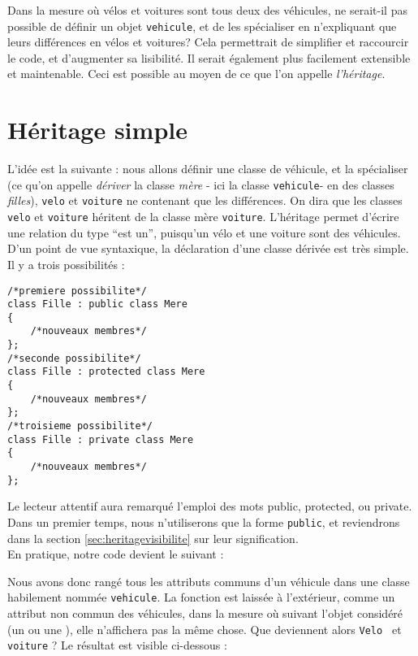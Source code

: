 Dans la mesure o\`u v\'elos et voitures sont tous deux des v\'ehicules, ne
serait-il pas possible de d\'efinir un objet \texttt{vehicule}, et de les
sp\'ecialiser en n'expliquant que leurs diff\'erences en v\'elos et voitures?
Cela permettrait de simplifier et raccourcir le code,  et d'augmenter sa
lisibilit\'e. Il serait \'egalement plus facilement extensible et maintenable.
Ceci est possible au moyen de ce que l'on appelle \emph{l'h\'eritage}.

\section{H\'eritage simple}
L'id\'ee est la suivante : nous allons d\'efinir une classe de v\'ehicule, et la
sp\'ecialiser (ce qu'on appelle \emph{d\'eriver} la classe \emph{m\`ere} - ici
la classe \texttt{vehicule}- en des classes \emph{filles}), \texttt{velo} et
\texttt{voiture} ne contenant que les diff\'erences. On dira que les classes
\texttt{velo} et \texttt{voiture} h\'eritent de la classe m\`ere
\texttt{voiture}. L'h\'eritage permet d'\'ecrire une relation du type ``est
un'', puisqu'un v\'elo et une voiture sont des v\'ehicules.\\

D'un point de vue syntaxique, la d\'eclaration d'une classe d\'eriv\'ee est
tr\`es simple. Il y a trois possibilit\'es :\\

\begin{DDbox}{\linewidth}
\begin{lstlisting}
/*premiere possibilite*/
class Fille : public class Mere
{
    /*nouveaux membres*/
};
/*seconde possibilite*/
class Fille : protected class Mere
{
    /*nouveaux membres*/
};
/*troisieme possibilite*/
class Fille : private class Mere
{
    /*nouveaux membres*/
};

\end{lstlisting}
\end{DDbox}

Le lecteur attentif aura remarqu\'e l'emploi des mots public, protected, ou
private. Dans un premier temps, nous n'utiliserons que la forme
\texttt{public}, et reviendrons dans la section \ref{sec:heritagevisibilite}
sur leur signification.\\

En pratique, notre code devient le suivant :\\


Nous avons donc rang\'e tous les attributs communs d'un v\'ehicule dans une
classe habilement nomm\'ee \texttt{vehicule}. La fonction
 est laiss\'ee \`a l'ext\'erieur, comme un
attribut non commun des v\'ehicules, dans la mesure o\`u suivant l'objet
consid\'er\'e (un  ou une ), elle
n'affichera pas la m\^eme chose. Que deviennent alors \texttt{Velo } et
\texttt{voiture} ? Le r\'esultat est visible ci-dessous :

